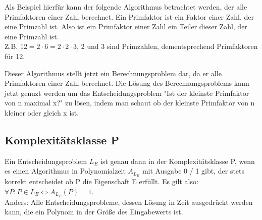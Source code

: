 \documentclass[
../AuD-Zusammenfassung.tex,
]
{subfiles}
\begin{document}
Als Beispiel hierfür kann der folgende Algorithmus betrachtet werden, der alle Primfaktoren einer Zahl berechnet. Ein Primfaktor ist ein Faktor einer Zahl, der eine Primzahl ist. Also ist ein Primfaktor einer Zahl ein Teiler dieser Zahl, der eine Primzahl ist.\\
Z.B. $12 = 2 \cdot 6 = 2 \cdot 2 \cdot 3$, 2 und 3 sind Primzahlen, dementsprechend Primfaktoren für 12. \\
\begin{algorithm}[H]



\end{algorithm}
Dieser Algorithmus stellt jetzt ein Berechnungsproblem dar, da er alle Primfaktoren einer Zahl berechnet. Die Lösung des Berechnungsproblems kann jetzt genuzt werden um das Entscheidungsproblem "Ist der kleinste Primfaktor von n maximal x?" zu lösen, indem man schaut ob der kleinste Primfaktor von n kleiner oder gleich x ist.\\

\subsection{Komplexitätsklasse P}
Ein Entscheidungsproblem $L_E$ ist genau dann in der Komplexitätsklasse P, wenn es einen Algorithmus in Polynomialzeit $A_{L_E}$ mit Ausgabe 0 / 1 gibt, der stets korrekt entscheidet ob P die Eigenschaft E erfüllt. Es gilt also: $\forall P: P \in L_E \Leftrightarrow A_{L_E}(P) = 1$.\\
Anders: Alle Entscheidungsprobleme, dessen Lösung in Zeit ausgedrückt werden kann, die ein Polynom in der Größe des Eingabewerts ist.
\end{document}
